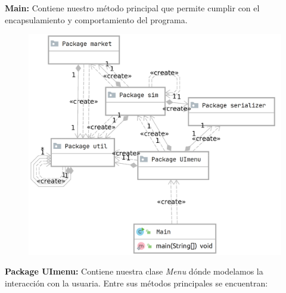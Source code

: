 \documentclass[letterpaper,11pt]{article}
\begin{document}
\textbf{Main: }Contiene nuestro método principal que permite cumplir con el encapsulamiento y comportamiento del programa.
\begin{figure}[htb]
	\centering
	\includegraphics[scale=.27]{main_diagram.png}
\end{figure}

\textbf{Package UImenu: } Contiene nuestra clase \textit{Menu} dónde modelamos la interacción con la usuaria. Entre sus métodos principales se encuentran:
\end{document}
